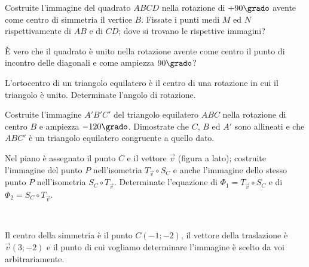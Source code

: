 \begin{esercizio}
\label{ese:8.59} %
Costruite l'immagine del quadrato $ABCD$ nella rotazione di 
$+90\grado$ avente come centro di simmetria il vertice $B$.
Fissate i punti medi $M$ ed $N$ rispettivamente di $AB$ e di $CD$; 
dove si trovano le rispettive immagini?
\end{esercizio}

\begin{esercizio}
\label{ese:8.60} %
\`E vero che il quadrato è unito nella rotazione avente come centro 
il punto di incontro delle diagonali e come ampiezza $90\grado$?
\end{esercizio}

\begin{esercizio}
\label{ese:8.61} %
L'ortocentro di un triangolo equilatero è il centro di una rotazione 
in cui il triangolo è unito. Determinate l'angolo di rotazione.
\end{esercizio}

\begin{esercizio}
\label{ese:8.62} %
Costruite l'immagine $A'B'C'$ del triangolo equilatero $ABC$ nella 
rotazione di centro $B$ e ampiezza $-120\grado$. Dimostrate che $C$, 
$B$ ed $A'$ sono allineati e che $ABC'$ è un triangolo equilatero 
congruente a quello dato.
\end{esercizio}

\noindent\begin{minipage}{0.75\textwidth}\parindent15pt
\begin{esercizio}
\label{ese:8.63} %
Nel piano è assegnato il punto $C$ e il vettore $\vec{v}$ (figura a 
lato); costruite l'immagine del punto $P$ nell'isometria $T_{\vec{v}} 
\circ S_{C}$ e anche l'immagine dello stesso punto $P$ nell'isometria 
$S_{C} \circ T_{\vec{v}}$. Determinate l'equazione di $\Phi_1 = 
T_{\vec{v}} \circ S_{C}$ e di $\Phi_2 = S_{C} \circ T_{\vec{v}}$.
\end{esercizio}
\end{minipage}\hfil
\begin{minipage}{0.25\textwidth}
	\centering~~
\end{minipage}\vspace{8pt}

\begin{esercizio}
\label{ese:8.64} %
Il centro della simmetria è il punto $C(-1;-2)$, il vettore della 
traslazione è $\vec{v}(3;-2)$ e il punto di cui vogliamo determinare 
l'immagine è scelto da voi arbitrariamente. 
\end{esercizio}

